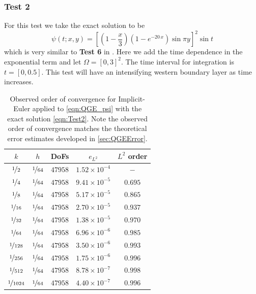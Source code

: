 \subsubsection*{Test 2}
For this test we take the exact solution to be
\begin{equation}
  \psi(t;x,y) = \left[(1-\frac{x}{3})\left(1-e^{-20\,x}\right) \sin \pi
    y\right]^2 \sin t
  \label{eqn:Test2}
\end{equation}
which is very similar to \textbf{Test 6} in \cite{Foster}. Here we add the time
dependence in the exponential term and let $\Omega = [0,3]^2$. The time interval
for integration is $t = [0,0.5]$. This test will have an intensifying western
boundary layer as time increases.
\begin{table}
\begin{center}
  \begin{tabular}{|c|c|c|c|c|}
    \hline
    $k$ & $h$ & DoFs & $e_{L^2}$ & $L^2$ order \\
    \hline
    $\nicefrac{1}{2}$ & $\nicefrac{1}{64}$ & $47958$ & $1.52\times 10^{-4}$ & $-$\\
    $\nicefrac{1}{4}$ & $\nicefrac{1}{64}$ & $47958$ & $9.41\times 10^{-5}$ & $0.695$\\
    $\nicefrac{1}{8}$ & $\nicefrac{1}{64}$ & $47958$ & $5.17\times 10^{-5}$ & $0.865$\\
    $\nicefrac{1}{16}$ & $\nicefrac{1}{64}$ & $47958$ & $2.70\times 10^{-5}$ & $0.937$\\
    $\nicefrac{1}{32}$ & $\nicefrac{1}{64}$ & $47958$ & $1.38\times 10^{-5}$ & $0.970$\\
    $\nicefrac{1}{64}$ & $\nicefrac{1}{64}$ & $47958$ & $6.96\times 10^{-6}$ & $0.985$\\
    $\nicefrac{1}{128}$ & $\nicefrac{1}{64}$ & $47958$ & $3.50\times 10^{-6}$ & $0.993$\\
    $\nicefrac{1}{256}$ & $\nicefrac{1}{64}$ & $47958$ & $1.75\times 10^{-6}$ & $0.996$\\
    $\nicefrac{1}{512}$ & $\nicefrac{1}{64}$ & $47958$ & $8.78\times 10^{-7}$ & $0.998$\\
    $\nicefrac{1}{1024}$ & $\nicefrac{1}{64}$ & $47958$ & $4.40\times 10^{-7}$ & $0.996$\\
    \hline
  \end{tabular}
\end{center}
  \caption{Observed order of convergence for Implicit-Euler applied to
    \eqref{eqn:QGE_psi} with the exact solution \eqref{eqn:Test2}. Note the observed
    order of convergence matches the theoretical error estimates developed in
    \autoref{sec:QGEError}.}
  \label{tab:Test2Time}
\end{table}

